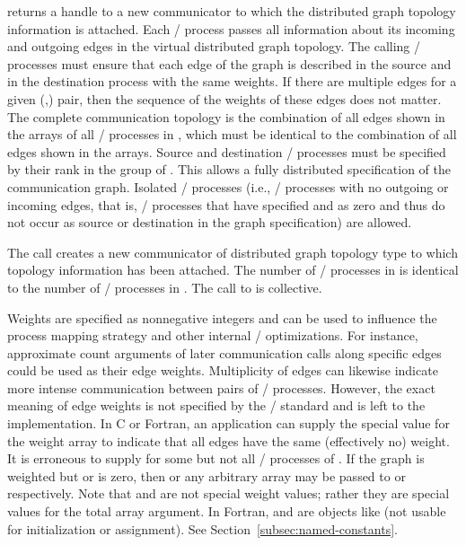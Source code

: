  returns a handle to a new
communicator to which the distributed graph topology information is
attached.  Each \MPI/ process passes all information about its incoming and
outgoing edges in the virtual distributed graph topology.  The calling
\MPI/ processes must ensure that each edge of the graph is described in the
source and in the destination process with the same weights. If there
are multiple edges for a given (,) pair, then the sequence
of the weights of these edges does not matter. The complete
communication topology is the combination of all edges shown in the
 arrays of all \MPI/ processes in , which must be
identical to the combination of all edges shown in the
 arrays.  Source and destination \MPI/ processes must be
specified by their rank in the group of 
. This allows a fully distributed
specification of the communication graph.  Isolated \MPI/ processes (i.e.,
\MPI/ processes with no outgoing or incoming edges, that is, \MPI/ processes that
have specified  and  as zero and
thus do not occur as source or destination in the graph
specification) are allowed.

The call creates a new communicator  of
distributed graph topology type to which topology information has been
attached. The number of \MPI/ processes in  is
identical to the number of \MPI/ processes in . The call to
 is collective.

Weights are specified as nonnegative integers and can be used to
influence the process mapping strategy and other internal \MPI/
optimizations. For instance, approximate count arguments of later
communication calls along specific edges could be used as their edge
weights. Multiplicity of edges can likewise indicate more intense
communication between pairs of \MPI/ processes. However, the exact meaning
of edge weights is not specified by the \MPI/ standard and is left to
the implementation. In C or Fortran, an application can supply the
special value  for the weight array to indicate
that all edges have the same (effectively no) weight. It is erroneous to supply
 for some but not all \MPI/ processes of
. 
If the graph is weighted but
 or  is zero, then  or any
arbitrary array may be passed to  or
 respectively. Note that  and
 are not special weight values; rather they
are special values for the total array argument.  In Fortran,
 and  are objects like
 (not usable for initialization or assignment).
See Section~\ref{subsec:named-constants}. %

